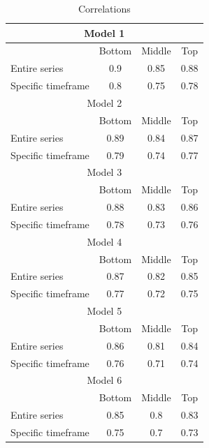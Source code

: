 \begin{table}[h!]
\centering
\caption{Correlations}
\begin{tabular}{|l|c|c|c|}
\hline
\multicolumn{4}{|c|}{Model 1} \\ \hline
& Bottom & Middle & Top \\ \hline
Entire series & 0.9 & 0.85 & 0.88 \\ \hline
Specific timeframe & 0.8 & 0.75 & 0.78 \\ \hline
\multicolumn{4}{|c|}{Model 2} \\ \hline
& Bottom & Middle & Top \\ \hline
Entire series & 0.89 & 0.84 & 0.87 \\ \hline
Specific timeframe & 0.79 & 0.74 & 0.77 \\ \hline
\multicolumn{4}{|c|}{Model 3} \\ \hline
& Bottom & Middle & Top \\ \hline
Entire series & 0.88 & 0.83 & 0.86 \\ \hline
Specific timeframe & 0.78 & 0.73 & 0.76 \\ \hline
\multicolumn{4}{|c|}{Model 4} \\ \hline
& Bottom & Middle & Top \\ \hline
Entire series & 0.87 & 0.82 & 0.85 \\ \hline
Specific timeframe & 0.77 & 0.72 & 0.75 \\ \hline
\multicolumn{4}{|c|}{Model 5} \\ \hline
& Bottom & Middle & Top \\ \hline
Entire series & 0.86 & 0.81 & 0.84 \\ \hline
Specific timeframe & 0.76 & 0.71 & 0.74 \\ \hline
\multicolumn{4}{|c|}{Model 6} \\ \hline
& Bottom & Middle & Top \\ \hline
Entire series & 0.85 & 0.8 & 0.83 \\ \hline
Specific timeframe & 0.75 & 0.7 & 0.73 \\ \hline
\end{tabular}
\end{table}
